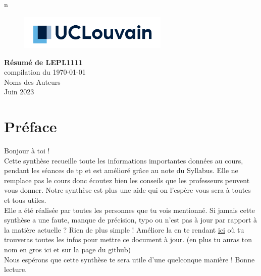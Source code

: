 n\documentclass{report}
\begin{document}
\begin{titlepage}
    \begin{figure}
        \includegraphics[height = 0.65in]{UCL_Logo.png}
        \label{fig:my_label}
    \end{figure}
    
    \hspace*{100cm}
    \centering
    \vspace*{7cm}

    {\Huge \textbf{Résumé de LEPL1111}}\\
    \vspace*{0.25cm}
    compilation du \today\\
    \vspace*{0.25cm}
    \Large{Noms des Auteurs}\\

    \vspace*{10cm}
    {\Large Juin 2023}
\end{titlepage}


\tableofcontents
\newpage

\section*{Préface}

Bonjour à toi !\\

Cette synthèse recueille toute les informations importantes données au cours, pendant les séances de tp et est amélioré grâce au note du Syllabus. Elle ne remplace pas le cours donc écoutez bien les conseils que les professeurs peuvent vous donner. Notre synthèse est plus une aide qui on l'espère vous sera à toutes et tous utiles.\\

Elle a été réalisée par toutes les personnes que tu vois mentionné. Si jamais cette synthèse a une faute, manque de précision, typo ou n'est pas à jour par rapport à la matière actuelle ? Rien de plus simple ! Améliore la en te rendant \href{http://www.github.com/Tfloow/Q4_EPL}{ici} où tu trouveras toutes les infos pour mettre ce document à jour. (en plus tu auras ton nom en gros ici et sur la page du github)\\

Nous espérons que cette synthèse te sera utile d'une quelconque manière ! Bonne lecture.
\end{document}

